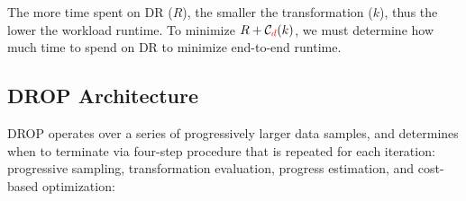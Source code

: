 
The more time spent on DR ($R$), the smaller the transformation ($k$), thus the lower the workload runtime.
To minimize $R + \mathcal{C}_{\color{red}d}(k)$, we must determine how much time to spend on DR to minimize end-to-end runtime.

\subsection{DROP Architecture}
\label{subsec:arch}
DROP operates over a series of progressively larger data samples, and determines when to terminate via  four-step procedure that is repeated for each iteration: progressive sampling, transformation evaluation, progress estimation, and cost-based optimization:




